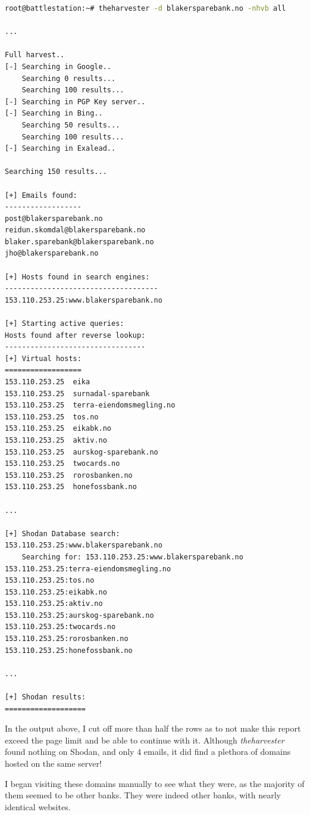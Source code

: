 \hspace*{-5in}\begin{lstlisting}[language=bash,caption={theharvester performing full harvest}]
root@battlestation:~# theharvester -d blakersparebank.no -nhvb all

...

Full harvest..
[-] Searching in Google..
	Searching 0 results...
	Searching 100 results...
[-] Searching in PGP Key server..
[-] Searching in Bing..
	Searching 50 results...
	Searching 100 results...
[-] Searching in Exalead..

Searching 150 results...

[+] Emails found:
------------------
post@blakersparebank.no
reidun.skomdal@blakersparebank.no
blaker.sparebank@blakersparebank.no
jho@blakersparebank.no

[+] Hosts found in search engines:
------------------------------------
153.110.253.25:www.blakersparebank.no

[+] Starting active queries:
Hosts found after reverse lookup:
---------------------------------
[+] Virtual hosts:
==================
153.110.253.25	eika
153.110.253.25	surnadal-sparebank
153.110.253.25	terra-eiendomsmegling.no
153.110.253.25	tos.no
153.110.253.25	eikabk.no
153.110.253.25	aktiv.no
153.110.253.25	aurskog-sparebank.no
153.110.253.25	twocards.no
153.110.253.25	rorosbanken.no
153.110.253.25	honefossbank.no

...

[+] Shodan Database search:
153.110.253.25:www.blakersparebank.no
	Searching for: 153.110.253.25:www.blakersparebank.no
153.110.253.25:terra-eiendomsmegling.no
153.110.253.25:tos.no
153.110.253.25:eikabk.no
153.110.253.25:aktiv.no
153.110.253.25:aurskog-sparebank.no
153.110.253.25:twocards.no
153.110.253.25:rorosbanken.no
153.110.253.25:honefossbank.no

...

[+] Shodan results:
===================
\end{lstlisting}

In the output above, I cut off more than half the rows as to not make this report exceed the page limit and be able to continue with it. Although \textit{theharvester} found nothing on Shodan, and only 4 emails, it did find a plethora of domains hosted on the same server!

I began visiting these domains manually to see what they were, as the majority of them seemed to be other banks. They were indeed other banks, with nearly identical websites.

